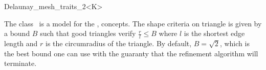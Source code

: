 \begin{ccRefClass}{Delaunay_mesh_traits_2<K>}

\ccDefinition
  
The class \ccRefName\ is a model for the ,
concepts. The shape criteria on triangle is given by a bound $B$ such
that good triangles verify $\frac{r}{l} \le B$ where $l$ is the
shortest edge length and $r$ is the circumradius of the triangle.  By
default, $B=\sqrt{2}$, which is the best bound one can use with the
guaranty that the refinement algorithm will terminate.


\ccIsModel


\ccCreation
{}
\end{ccRefClass}

